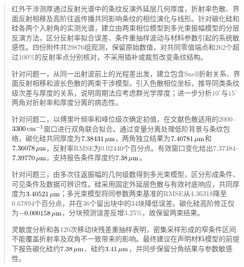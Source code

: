 \begin{abstract}
红外干涉测厚通过反射光谱中的条纹反演外延层几何厚度，折射率色散、界面反射相移及高阶往返传播共同影响条纹的相位演化与线形。针对碳化硅和硅各两个入射角的实测光谱，建立由两束相位模型到多光束振幅模型的分层反演方法，区分反射率拟合误差、条件重抽样波动与材料参数引起的系统敏感性。四份附件共29876组观测，保留原始数值，对共同零值端点和262个超过100\%的反射率点分别核对，不采用插补或裁剪改变条纹结构。

针对问题一，从同一出射波前上的光程差出发，建立包含Snell折射关系、界面反射相移和波长色散的两束干涉模型。引入色散相位坐标，推导同类条纹级次差与厚度的关系，说明周期法应考虑群光学厚度；进一步分析$10^\circ$与$15^\circ$两角对折射率和厚度分离的病态性。

针对问题二，以傅里叶频率和峰位级次确定初值，在文献色散适用的$2000$--$3300\cmiv$窗口进行双角联合拟合。通过变量分离处理低阶背景与条纹包络，碳化硅共同厚度为$7.38431\um$，两角独立结果为$7.40781\um$和$7.36078\um$，反射率RMSE为0.02440个百分点。有效窗口变化给出$7.37384$--$7.39770\um$，支持报告条件厚度约$7.38\um$。

针对问题三，由多次往返振幅的几何级数得到多光束模型，区分形成条件、可见条件及数据可辨识性。硅采用固定外延层色散与有效衬底响应，共同厚度为$3.40521\um$；多光束模型将同参数两束基准的RMSE从4.36318降至0.67894个百分点，并在36个留出块中的34块降低误差。碳化硅高阶修正仅为$-0.000158\um$，分块预测误差反增3.25\%，故保留两束结果。

灵敏度分析和各120次移动块残差重抽样表明，密集采样形成的窄条件区间不能覆盖折射率及双角不一致带来的影响。最终建议在声明材料模型的前提下报告碳化硅约$7.38\um$、硅约$3.41\um$，并同步保留分角结果与参数敏感性。
\end{abstract}

